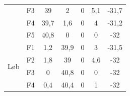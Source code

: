\begin{table}[H]
{\begin{tabular}{ccccccc}
		& F3             & 39                                                                                                  & 2                                                                                                & 0       & 5,1    & -31,7                                                                                          \\
		& F4             & 39,7                                                                                                & 1,6                                                                                              & 0      & 4   & -31,2                                                                                           \\
		& F5             & 40,8                                                                                                & 0                                                                                                & 0      & 0    & -32                                                                                          \\ \hline
		\multirow{5}{*}{Løb}                                                      & F1                                                                                                          & 1,2 & 39,9                                                                                             & 0     & 3 & -31,5                                                                                               \\
		& F2                                                                                           & 1,8  & 39                                                                                            & 0         & 4,6     & -32                                                                                       \\
		& F3                                                                                              & 0    & 40,8                                                                                            & 0      & 0         & -32                                                                                      \\
		& F4                                                                                                      & 0,4  & 40,4                                                                                            & 0     & 1    & -32                                                                                           \\

\end{tabular}}
\end{table}
